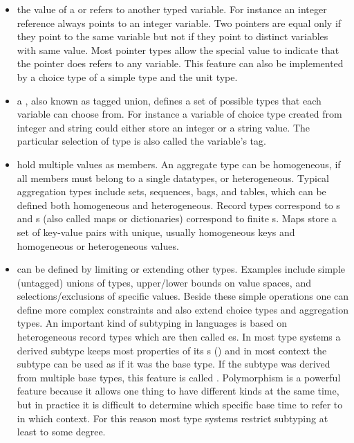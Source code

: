 \begin{itemize}
  
\item the value of a  or  refers to
  another typed variable. For instance an integer reference always points to an
  integer variable. Two pointers are equal only if they point to the same
  variable but not if they point to distinct variables with same value. Most
  pointer types allow the special value  to indicate that the pointer
  does refers to any variable. This feature can also be implemented by a choice
  type of a simple type and the unit type.

\item a , also known as tagged union,
  defines a set of possible types that each variable can choose from. For instance
  a variable of choice type created from integer and string could either store an 
  integer or a string value. The particular selection of type is also called the 
  variable's tag.

\item {} hold multiple values as members. An aggregate type
  can be homogeneous, if all members must belong to a single datatypes, or 
  heterogeneous. Typical aggregation types include sets, sequences, bags, and tables,
  which can be defined both homogeneous and heterogeneous. Record types correspond
  to s and s (also called maps or dictionaries) 
  correspond to finite s. Maps store a set of key-value pairs with
  unique, usually homogeneous keys and homogeneous or heterogeneous values.

\item {} can be defined by limiting or extending other
  types.  Examples include simple (untagged) unions of types, upper/lower bounds
  on value spaces, and selections/exclusions of specific values. Beside these
  simple  operations one can define more complex constraints and also
  extend choice types and aggregation types. An important kind of subtyping in
   languages is based on heterogeneous record types which
  are then called es. In most type systems a derived subtype keeps
  most properties of its s () and in most context
  the subtype can be used as if it was the base type. If the subtype was derived
  from multiple base types, this feature is called . Polymorphism
  is a powerful feature because it allows one thing to have different kinds at the
  same time, but in practice it is difficult to determine which specific base time
  to refer to in which context. For this reason most type systems restrict
  subtyping at least to some degree.

\end{itemize}

